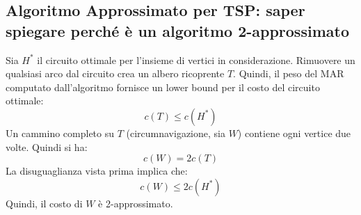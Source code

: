 \documentclass[11pt]{article}
\begin{document}
\subsection*{Algoritmo Approssimato per TSP: saper spiegare perché è un algoritmo 2-approssimato}
Sia $H^*$ il circuito ottimale per l'insieme di vertici in considerazione. Rimuovere un qualsiasi arco dal circuito crea 
un albero ricoprente $T$. Quindi, il peso del MAR computato dall'algoritmo fornisce un lower bound per il costo del circuito 
ottimale:
\begin{equation*}
    c(T)\leq c(H^*)
\end{equation*}
Un cammino completo su $T$ (circumnavigazione, sia $W$) contiene ogni vertice due volte. Quindi si ha:
\begin{equation*}
    c(W)= 2c(T)
\end{equation*}
La disuguaglianza vista prima implica che:
\begin{equation*}
    c(W)\leq 2c(H^*)
\end{equation*}
Quindi, il costo di $W$ è 2-approssimato.
\end{document}
